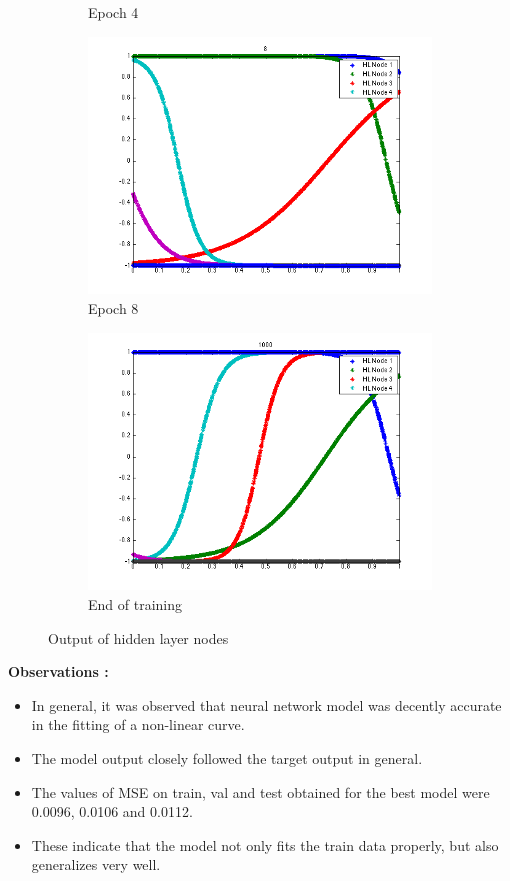 \documentclass{article}
\begin{document}
\begin{figure}
\begin{subfigure}{.5\textwidth}
  \caption{Epoch 4}
\end{subfigure}%
\begin{subfigure}{.5\textwidth}
  \centering
  \includegraphics[width=.8\linewidth]{Regression/univariate/hiddenLayer_8.png}
   \caption{Epoch 8}
  \end{subfigure}
  
  \begin{subfigure}{0.5\textwidth}
  \centering
  \includegraphics[width=0.8\linewidth]{Regression/univariate/hiddenLayer_1000.png}
   \caption{End of training}
  \end{subfigure}
  
\caption{Output of hidden layer nodes}
\end{figure}


\textbf{Observations :}

\begin{itemize}
\item In general, it was observed that neural network model was decently accurate in the fitting of a non-linear curve. 
\item The model output closely followed the target output in general. 
\item The values of MSE on train, val and test obtained for the best model were 0.0096, 0.0106 and 0.0112. \item These indicate that the model not only fits the train data properly, but also generalizes very well.
\end{itemize}
\end{document}
